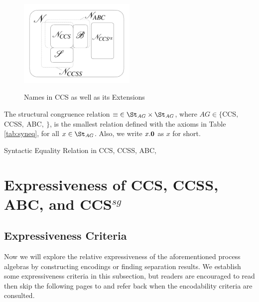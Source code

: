 \documentclass[adraft,hidelinks]{eptcs}
\begin{document}
\begin{figure}[ht]
  \centering
  \caption{Names in CCS as well as its Extensions}
  \includegraphics[width = 0.5\textwidth]{images/names.pdf}
  \label{fig:names}
\end{figure}

The structural congruence relation ${\equiv}\in\St_{AG}\times\St_{AG}$, where $AG\in\{$CCS$,\ $CCSS$,\ $ABC$,\ $\CSG$\}$, is the smallest relation defined with the axioms in Table \ref{tab:syneq}, for all $x\in\St_{AG}$. %
Also, we write $x.\textbf{0}$ as $x$ for short.

\begin{table}[t]
\centering
\caption{Syntactic Equality Relation in CCS, CCSS, ABC, \CSG}
\label{tab:syneq}
\end{table}


%
\section {Expressiveness of CCS, CCSS, ABC, and CCS$^{sg}$}
\label{sec:expre}

\subsection{Expressiveness Criteria}
\label{sec:criteria}
Now we will explore the relative expressiveness of the aforementioned process algebras by constructing encodings or finding separation results.
We establish some expressiveness criteria in this subsection, but readers are encouraged to read  then skip the following pages to  and refer back when the encodability criteria are consulted.
\end{document}
